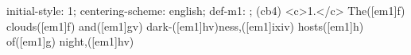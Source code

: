 initial-style: 1;
centering-scheme: english;
def-m1: \grealign;
(cb4) <c>1.</c> The([em1]f) clouds([em1]f) and([em1]gv) dark-([em1]hv)ness,([em1]ixiv) hosts([em1]h) of([em1]g) night,([em1]hv)